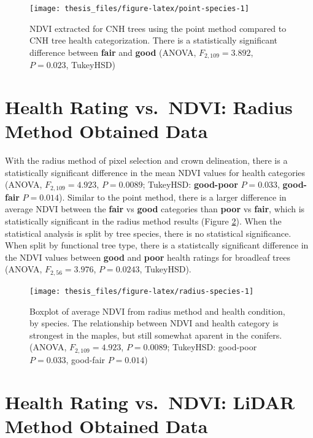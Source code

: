 \documentclass[12pt,twoside]{reedthesis}
\begin{document}
\begin{figure}[H]

{\centering \texttt{[image: thesis\_files/figure-latex/point-species-1]} 

}

\caption[Point Method NDVI and Health Rating, by Species]{NDVI extracted for CNH trees using the point method
compared to CNH tree health categorization. There is a statistically
significant difference between \textbf{fair} and \textbf{good} (ANOVA,
\(F_{2, 109} = 3.892\), \(P = 0.023\), TukeyHSD)}\label{fig:point-species}
\end{figure}
\hypertarget{health-rating-vs.-ndvi-radius-method-obtained-data}{%
\section{Health Rating vs.~NDVI: Radius Method Obtained Data}\label{health-rating-vs.-ndvi-radius-method-obtained-data}}

With the radius method of pixel selection and crown delineation, there
is a statistically significant difference in the mean NDVI values for
health categories (ANOVA, \(F_{2,109}=4.923\), \(P = 0.0089\); TukeyHSD:
\textbf{good-poor} \(P = 0.033\), \textbf{good-fair} \(P = 0.014\)). Similar to the
point method, there is a larger difference in average NDVI between the
\textbf{fair} vs \textbf{good} categories than \textbf{poor} vs \textbf{fair}, which is
statistically significant in the radius method results (Figure
\ref{fig:radius-species}). When the statistical analysis is split by
tree species, there is no statistical significance. When split by
functional tree type, there is a statistcally significant difference in
the NDVI values between \textbf{good} and \textbf{poor} health ratings for
broadleaf trees (ANOVA, \(F_{2,56}=3.976\), \(P = 0.0243\), TukeyHSD).
\begin{figure}[H]

{\centering \texttt{[image: thesis\_files/figure-latex/radius-species-1]} 

}

\caption[Radius method mean NDVI and health condition by species]{Boxplot of average NDVI from radius method and health condition, by species. The relationship between NDVI and health category is strongest in the maples, but still somewhat aparent in the conifers. (ANOVA, $F_{2,109}=4.923$, $P = 0.0089$; TukeyHSD: good-poor $P = 0.033$, good-fair $P = 0.014$)}\label{fig:radius-species}
\end{figure}
\hypertarget{health-rating-vs.-ndvi-lidar-method-obtained-data}{%
\section{Health Rating vs.~NDVI: LiDAR Method Obtained Data}\label{health-rating-vs.-ndvi-lidar-method-obtained-data}}
\end{document}
